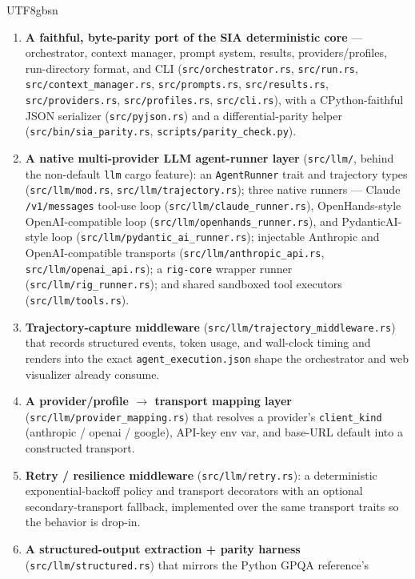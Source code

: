 \documentclass{article}
\begin{document}
\begin{CJK}{UTF8}{gbsn}
\begin{enumerate}
\item \textbf{A faithful, byte-parity port of the SIA deterministic core} ---
  orchestrator, context manager, prompt system, results, providers/profiles,
  run-directory format, and CLI (\texttt{src/orchestrator.rs}, \texttt{src/run.rs},
  \texttt{src/context\_manager.rs}, \texttt{src/prompts.rs}, \texttt{src/results.rs},
  \texttt{src/providers.rs}, \texttt{src/profiles.rs}, \texttt{src/cli.rs}), with a
  CPython-faithful JSON serializer (\texttt{src/pyjson.rs}) and a differential-parity
  helper (\texttt{src/bin/sia\_parity.rs}, \texttt{scripts/parity\_check.py}).
\item \textbf{A native multi-provider LLM agent-runner layer} (\texttt{src/llm/},
  behind the non-default \texttt{llm} cargo feature): an \texttt{AgentRunner} trait
  and trajectory types (\texttt{src/llm/mod.rs}, \texttt{src/llm/trajectory.rs});
  three native runners --- Claude \texttt{/v1/messages} tool-use loop
  (\texttt{src/llm/claude\_runner.rs}), OpenHands-style OpenAI-compatible loop
  (\texttt{src/llm/openhands\_runner.rs}), and PydanticAI-style loop
  (\texttt{src/llm/pydantic\_ai\_runner.rs}); injectable Anthropic and
  OpenAI-compatible transports (\texttt{src/llm/anthropic\_api.rs},
  \texttt{src/llm/openai\_api.rs}); a \texttt{rig-core} wrapper runner
  (\texttt{src/llm/rig\_runner.rs}); and shared sandboxed tool executors
  (\texttt{src/llm/tools.rs}).
\item \textbf{Trajectory-capture middleware} (\texttt{src/llm/trajectory\_middleware.rs})
  that records structured events, token usage, and wall-clock timing and renders into
  the exact \texttt{agent\_execution.json} shape the orchestrator and web visualizer
  already consume.
\item \textbf{A provider/profile $\rightarrow$ transport mapping layer}
  (\texttt{src/llm/provider\_mapping.rs}) that resolves a provider's
  \texttt{client\_kind} (anthropic / openai / google), API-key env var, and base-URL
  default into a constructed transport.
\item \textbf{Retry / resilience middleware} (\texttt{src/llm/retry.rs}): a
  deterministic exponential-backoff policy and transport decorators with an optional
  secondary-transport fallback, implemented over the same transport traits so the
  behavior is drop-in.
\item \textbf{A structured-output extraction + parity harness}
  (\texttt{src/llm/structured.rs}) that mirrors the Python GPQA reference's

\end{enumerate}
\end{CJK}
\end{document}
